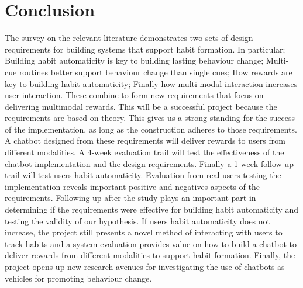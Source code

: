 
\newpage
\section{Conclusion}

The survey on the relevant literature demonstrates two sets of design requirements for building systems that support habit formation. In particular; Building habit automaticity is key to building lasting behaviour change; Multi-cue routines better support behaviour change than single cues; How rewards are key to building habit automaticity; Finally how multi-modal interaction increases user interaction. These combine to form new requirements that focus on delivering multimodal rewards.\newline
\newline
This will be a successful project because the requirements are based on theory. This gives us a strong standing for the success of the implementation, as long as the construction adheres to those requirements.\newline
\newline
A chatbot designed from these requirements will deliver rewards to users from different modalities. A 4-week evaluation trail will test the effectiveness of the chatbot implementation and the design requirements. Finally a 1-week follow up trail will test users habit automaticity.\newline
\newline
Evaluation from real users testing the implementation reveals important positive and negatives aspects of the requirements. Following up after the study plays an important part in determining if the requirements were effective for building habit automaticity and testing the validity of our hypothesis. If users habit automaticity does not increase, the project still presents a novel method of interacting with users to track habits and a system evaluation provides value on how to build a chatbot to deliver rewards from different modalities to support habit formation. Finally, the project opens up new research avenues for investigating the use of chatbots as vehicles for promoting behaviour change.
